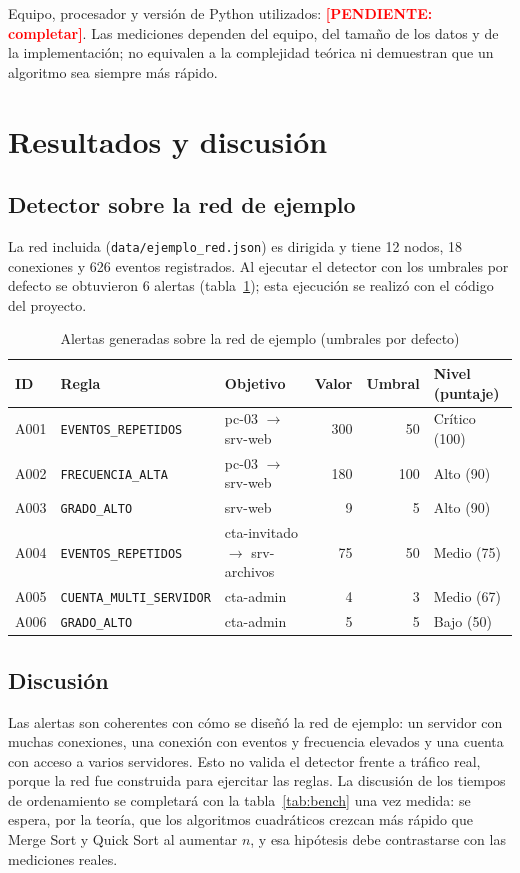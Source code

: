 \documentclass[12pt,a4paper]{article}
\newcommand{\pendiente}[1]{\textcolor{red}{\textbf{[PENDIENTE: #1]}}}
\begin{document}
\noindent Equipo, procesador y versión de Python utilizados: \pendiente{completar}. Las mediciones dependen del equipo, del tamaño de los datos y de la implementación; no equivalen a la complejidad teórica ni demuestran que un algoritmo sea siempre más rápido.

\section{Resultados y discusión}
\subsection{Detector sobre la red de ejemplo}
La red incluida (\texttt{data/ejemplo\_red.json}) es dirigida y tiene 12 nodos, 18 conexiones y 626 eventos registrados. Al ejecutar el detector con los umbrales por defecto se obtuvieron 6 alertas (tabla~\ref{tab:alertas}); esta ejecución se realizó con el código del proyecto.

\begin{table}[h]
\centering
\caption{Alertas generadas sobre la red de ejemplo (umbrales por defecto)}\label{tab:alertas}
\small
\begin{tabular}{@{}llp{3.3cm}rrl@{}}
\toprule
\textbf{ID} & \textbf{Regla} & \textbf{Objetivo} & \textbf{Valor} & \textbf{Umbral} & \textbf{Nivel (puntaje)}\\
\midrule
A001 & \texttt{EVENTOS\_REPETIDOS} & pc-03 $\to$ srv-web & 300 & 50 & Crítico (100)\\
A002 & \texttt{FRECUENCIA\_ALTA} & pc-03 $\to$ srv-web & 180 & 100 & Alto (90)\\
A003 & \texttt{GRADO\_ALTO} & srv-web & 9 & 5 & Alto (90)\\
A004 & \texttt{EVENTOS\_REPETIDOS} & cta-invitado $\to$ srv-archivos & 75 & 50 & Medio (75)\\
A005 & \texttt{CUENTA\_MULTI\_SERVIDOR} & cta-admin & 4 & 3 & Medio (67)\\
A006 & \texttt{GRADO\_ALTO} & cta-admin & 5 & 5 & Bajo (50)\\
\bottomrule
\end{tabular}
\end{table}

\subsection{Discusión}
Las alertas son coherentes con cómo se diseñó la red de ejemplo: un servidor con muchas conexiones, una conexión con eventos y frecuencia elevados y una cuenta con acceso a varios servidores. Esto no valida el detector frente a tráfico real, porque la red fue construida para ejercitar las reglas. La discusión de los tiempos de ordenamiento se completará con la tabla~\ref{tab:bench} una vez medida: se espera, por la teoría, que los algoritmos cuadráticos crezcan más rápido que Merge Sort y Quick Sort al aumentar $n$, y esa hipótesis debe contrastarse con las mediciones reales.
\end{document}
